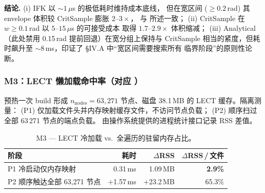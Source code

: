 \documentclass[journal]{IEEEtran}
\begin{document}
\begin{table}[ht]
\centering
\caption{M2 — LinkIAABB envelope 上各 epiAABB 源的体积-耗时 Pareto
（\emph{每宽度分组中位数}，单位 m$^3$/\,$\mu$s）。}
\label{tab:m2_pareto}
\end{table}

\textbf{结论.} (i) IFK 以 $\sim\!1\,\mu$s 的极低耗时维持成本底线，
但在宽区间 ($\geq\!0.2$\,rad) 其 envelope 体积较 CritSample 膨胀 $2\text{–}3\times$，
与  所述一致；
(ii) CritSample 在 $w\!\geq\!0.1$\,rad 以 $5\text{–}15\,\mu$s 的可接受成本
取得 $1.7\text{–}2.9\times$ 体积缩减；
(iii) Analytical（此处禁用 0.15\,rad 提前回退）在宽分组上保持与 CritSample
相当的紧度，但耗时飙升至 ${\sim}8$\,ms，印证了 §IV.A 中“宽区间需要搜索所有
临界阶段”的原则性论断。

\subsubsection{M3：LECT 懒加载命中率（对应 ）}
预热一次 build 形成 $n_\text{nodes}{=}63{,}271$ 节点、磁盘 38.1\,MB 的
LECT 缓存。隔离测量：
(P1) 仅加载文件头并内存映射缓存文件，不访问节点负载；
(P2) 顺序扫过全部 63\,271 节点的端点负载。
由操作系统提供的进程统计接口记录 RSS 差值。

\begin{table}[ht]
\centering
\caption{M3 — LECT 冷加载 vs.\ 全遍历的驻留内存占比。}
\label{tab:m3_lazy}
\begin{tabular}{@{}lrrr@{}}
\toprule
\textbf{阶段} & \textbf{耗时} & $\Delta$\textbf{RSS} & $\Delta$\textbf{RSS}\,/\,文件 \\
\midrule
P1 冷启动仅内存映射             & 0.31\,ms & 1.09\,MB & \textbf{2.9\%} \\
P2 顺序触达全部 63{,}271 节点     & +1.57\,ms & +23.2\,MB & 65.3\% \\
\bottomrule
\end{tabular}
\end{table}
\end{document}
